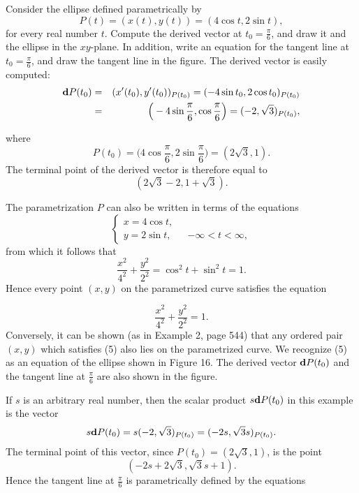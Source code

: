 \begin{example} Consider the ellipse defined parametrically by 
$$
P(t) = (x(t), y(t)) = (4 \cos t, 2 \sin t),
$$
for every real number $t$. Compute the derived vector at $t_0 = \frac{\pi}{6}$, and draw it and the ellipse in the $xy$-plane. In addition, write an equation for the tangent line at $t_0 = \frac{\pi}{6}$, and draw the tangent line in the figure. The derived vector is easily computed: 
\begin{eqnarray*}
\mbox{\bf{d}}P(t_0) &=& (x'(t_0), y'(t_0))_{P(t_0)} = (- 4 \sin t_0, 2 \cos t_0)_{P(t_0)} \\
&=& \Big(- 4\sin\frac{\pi}{6}, \cos\frac{\pi}{6} \Big) = (-2, \sqrt{3})_{P(t_0)}, 
\end{eqnarray*}

\noindent where
$$
P(t_0) = \Big(4\cos\frac{\pi}{6}, 2 \sin\frac{\pi}{6} \Big) = (2\sqrt{3}, 1).
$$
The terminal point of the derived vector is therefore equal to 
$$
(2\sqrt{3} - 2, 1 + \sqrt 3).
$$

The parametrization $P$ can also be written in terms of the equations 
$$
\left \{ \begin{array}{ll}
x = 4 \cos t,        & \\
y = 2 \sin t, \;\;\; &-\infty < t < \infty, 
\end{array}
\right .
$$
from which it follows that
$$
\frac{x^2}{4^2} + \frac{y^2}{2^2} = \cos^{2} t + \sin^{2} t = 1.
$$
Hence every point $(x, y)$ on the parametrized curve satisfies the equation

\begin{equation}
\frac{x^2}{4^2} + \frac{y^2}{2^2} = 1 .
\label{eq10.4.5}
\end{equation}
Conversely, it can be shown (as in Example 2, page 544) that any ordered pair $(x, y)$ which satisfies (5) also lies on the parametrized curve. We recognize (5) as an equation of the ellipse shown in Figure 16. The derived vector $\mbox{\bf{d}}P(t_0)$ and the tangent line at $\frac{\pi}{6}$ are also shown in the figure.


If $s$ is an arbitrary real number, then the scalar product $s\mbox{\bf{d}}P(t_0)$ in this example is the vector
$$
s\mbox{\bf{d}}P(t_0) = s(- 2, \sqrt 3)_{P(t_0)} = (- 2s, \sqrt{3} s)_{P(t_0)}.
$$
The terminal point of this vector, since $P(t_0) = (2\sqrt{3}, 1)$, is the point
$$
(-2s + 2\sqrt 3, \sqrt{3} s + 1).
$$
Hence the tangent line at $\frac{\pi}{6}$ is parametrically defined by the equations


\end{example}
